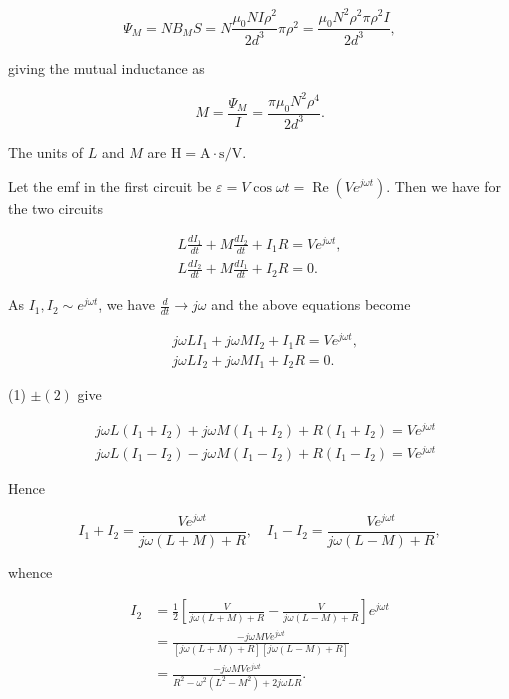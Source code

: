 \documentclass[10pt]{article}
\begin{document}
$$
\Psi_{M}=N B_{M} S=N \frac{\mu_{0} N I \rho^{2}}{2 d^{3}} \pi \rho^{2}=\frac{\mu_{0} N^{2} \rho^{2} \pi \rho^{2} I}{2 d^{3}},
$$



giving the mutual inductance as

$$
M=\frac{\Psi_{M}}{I}=\frac{\pi \mu_{0} N^{2} \rho^{4}}{2 d^{3}} .
$$

The units of $L$ and $M$ are $\mathrm{H}=\mathrm{A} \cdot \mathrm{s} / \mathrm{V}$.

 Let the emf in the first circuit be $\varepsilon=V \cos \omega t=\operatorname{Re}\left(V e^{j \omega t}\right)$. Then we have for the two circuits

$$
\begin{gathered}
L \frac{d I_{1}}{d t}+M \frac{d I_{2}}{d t}+I_{1} R=V e^{j \omega t}, \\
L \frac{d I_{2}}{d t}+M \frac{d I_{1}}{d t}+I_{2} R=0 .
\end{gathered}
$$

As $I_{1}, I_{2} \sim e^{j \omega t}$, we have $\frac{d}{d t} \rightarrow j \omega$ and the above equations become

$$
\begin{aligned}
&j \omega L I_{1}+j \omega M I_{2}+I_{1} R=V e^{j \omega t}, \\
&j \omega L I_{2}+j \omega M I_{1}+I_{2} R=0 .
\end{aligned}
$$

(1) $\pm(2)$ give

$$
\begin{aligned}
&j \omega L\left(I_{1}+I_{2}\right)+j \omega M\left(I_{1}+I_{2}\right)+R\left(I_{1}+I_{2}\right)=V e^{j \omega t} \\
&j \omega L\left(I_{1}-I_{2}\right)-j \omega M\left(I_{1}-I_{2}\right)+R\left(I_{1}-I_{2}\right)=V e^{j \omega t}
\end{aligned}
$$

Hence

$$
I_{1}+I_{2}=\frac{V e^{j \omega t}}{j \omega(L+M)+R}, \quad I_{1}-I_{2}=\frac{V e^{j \omega t}}{j \omega(L-M)+R},
$$

whence

$$
\begin{aligned}
I_{2} &=\frac{1}{2}\left[\frac{V}{j \omega(L+M)+R}-\frac{V}{j \omega(L-M)+R}\right] e^{j \omega t} \\
&=\frac{-j \omega M V e^{j \omega t}}{[j \omega(L+M)+R][j \omega(L-M)+R]} \\
&=\frac{-j \omega M V e^{j \omega t}}{R^{2}-\omega^{2}\left(L^{2}-M^{2}\right)+2 j \omega L R} .
\end{aligned}
$$
\end{document}
